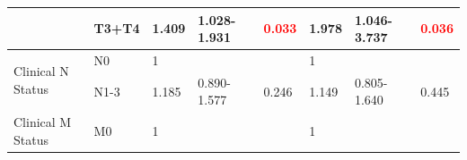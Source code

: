 \documentclass[cancers,article,submit,moreauthors,pdftex]{Definitions/mdpi}
\begin{document}
\begin{table}[hp]
{\begin{tabular}{|l|l|l|l|l|l|l|l|}
\cline{2-8}
                                        & T3+T4                                                                               & 1.409                                                                          & 1.028-1.931                                                                   & \textcolor{red}{0.033}                                                        & 1.978                                                                          & 1.046-3.737                                                                   & \textcolor{red}{0.036}                                                         \\ 
\hline
\multirow{2}{*}{Clinical N Status}      & {\cellcolor[rgb]{0.62,0.812,0.878}}N0                                               & {\cellcolor[rgb]{0.62,0.812,0.878}}1                                           & {\cellcolor[rgb]{0.62,0.812,0.878}}                                           & {\cellcolor[rgb]{0.62,0.812,0.878}}                                           & {\cellcolor[rgb]{0.62,0.812,0.878}}1                                           & {\cellcolor[rgb]{0.62,0.812,0.878}}                                           & {\cellcolor[rgb]{0.62,0.812,0.878}}                                            \\ 
\cline{2-8}
                                        & N1-3                                                                                & 1.185                                                                          & 0.890-1.577                                                                   & 0.246                                                                         & 1.149                                                                          & 0.805-1.640                                                                   & 0.445                                                                          \\ 
\hline
\multirow{2}{*}{Clinical M Status}      & {\cellcolor[rgb]{0.62,0.812,0.878}}M0                                               & {\cellcolor[rgb]{0.62,0.812,0.878}}1                                           & {\cellcolor[rgb]{0.62,0.812,0.878}}                                           & {\cellcolor[rgb]{0.62,0.812,0.878}}                                           & {\cellcolor[rgb]{0.62,0.812,0.878}}1                                           & {\cellcolor[rgb]{0.62,0.812,0.878}}                                           & {\cellcolor[rgb]{0.62,0.812,0.878}}                                            \\ 

\end{tabular}}
\end{table}
\end{document}
